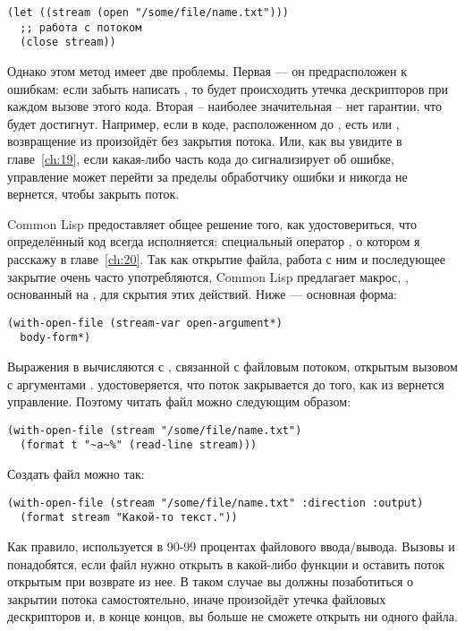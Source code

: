 \begin{lstlisting}
(let ((stream (open "/some/file/name.txt"))) 
  ;; работа с потоком
  (close stream)) 
\end{lstlisting}

Однако этом метод имеет две проблемы. Первая — он предрасположен к ошибкам: если забыть
написать , то будет происходить утечка дескрипторов при каждом вызове этого
кода. Вторая -- наиболее значительная -- нет гарантии, что  будет
достигнут. Например, если в коде, расположенном до , есть  или
, возвращение из  произойдёт без закрытия потока. Или, как вы
увидите в главе~\ref{ch:19}, если какая-либо часть кода до  сигнализирует об
ошибке, управление может перейти за пределы  обработчику ошибки и никогда не
вернется, чтобы закрыть поток.

Common Lisp предоставляет общее решение того, как удостовериться, что определённый код
всегда исполняется: специальный оператор , о котором я расскажу в
главе~\ref{ch:20}. Так как открытие файла, работа с ним и последующее закрытие очень часто
употребляются, Common Lisp предлагает макрос, , основанный на
, для скрытия этих действий. Ниже — основная форма:

\begin{lstlisting}
(with-open-file (stream-var open-argument*) 
  body-form*) 
\end{lstlisting}

Выражения в  вычисляются с , связанной с файловым
потоком, открытым вызовом  с аргументами
.  удостоверяется, что поток 
закрывается до того, как из  вернется управление. Поэтому читать файл
можно следующим образом:

\begin{lstlisting}
(with-open-file (stream "/some/file/name.txt") 
  (format t "~a~%" (read-line stream))) 
\end{lstlisting}

Создать файл можно так:

\begin{lstlisting}
(with-open-file (stream "/some/file/name.txt" :direction :output) 
  (format stream "Какой-то текст.")) 
\end{lstlisting}

Как правило,  используется в 90-99 процентах файлового
ввода/вывода. Вызовы  и  понадобятся, если файл нужно открыть в
какой-либо функции и оставить поток открытым при возврате из нее. В таком случае вы должны
позаботиться о закрытии потока самостоятельно, иначе произойдёт утечка файловых
дескрипторов и, в конце концов, вы больше не сможете открыть ни одного файла.

